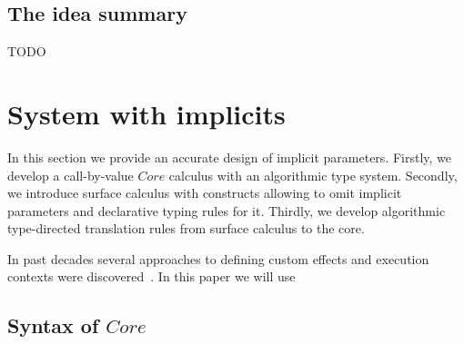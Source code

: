\documentclass[acmsmall]{acmart}
\begin{document}

\subsection{The idea summary} \label{subsec:idea-summary}

TODO %


\section{System with implicits} \label{sec:implicits}

In this section we provide an accurate design of implicit parameters.
Firstly, we develop a call-by-value $Core$ calculus with an algorithmic type system.
Secondly, we introduce surface calculus with constructs allowing to omit implicit parameters and declarative typing rules for it.
Thirdly, we develop algorithmic type-directed translation rules from surface calculus to the core.

In past decades several approaches to defining custom effects and execution contexts were discovered~\cite{plotkin2003algebraic, plotkin2013handling, moggi1988computational, liang1995monad, schrijvers2019monad}.
In this paper we will use

\subsection{Syntax of $Core$} \label{subsec:core-syntax}
\end{document}
